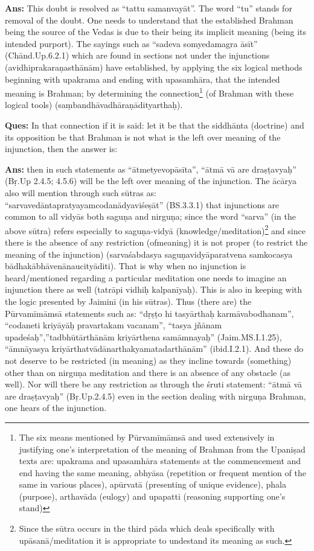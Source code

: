 \textbf{Ans:} This doubt is resolved as “tattu samanvayāt”. The word “tu” stands for removal of the doubt. One needs to understand that the established Brahman being the source of the Vedas is due to their being its implicit meaning (being its intended purport). The sayings such as “sadeva somyedamagra āsīt” (Chānd.Up.6.2.1) which are found in sections not under the injunctions (avidhiprakaraṇasthānām) have established, by applying the six logical methods beginning with upakrama and ending with upasamhāra, that the intended meaning is Brahman;  by determining the connection\footnote{The six means mentioned by Pūrvamīmāmsā and used extensively in justifying one’s interpretation of the meaning of Brahman from the Upaniṣad texts are: upakrama and upasamhāra statements at the commencement and end having the same meaning, abhyāsa (repetition or frequent mention of the same in various places), apūrvatā (presenting of unique evidence), phala (purpose), arthavāda (eulogy) and upapatti (reasoning supporting one’s stand)} (of Brahman with these logical tools) (saṃbandhāvadhāraṇādityarthaḥ).

\textbf{Ques:} In that connection if it is said: let it be that the siddhānta (doctrine) and its opposition be that Brahman is not what is the left over meaning of the injunction, then the answer is: 

\textbf{Ans:} then in such statements as “ātmetyevopāsīta”, “ātmā vā are dra\-ṣṭavyaḥ” (Bṛ.Up 2.4.5; 4.5.6) will be the left over meaning of the injunction. The ācārya also will mention through such sūtras as: “sarvavedāntapratyayamcodanādyaviśeṣāt” (BS.3.3.1) that injunctions are common to all vidyās both saguṇa and nirguṇa; since the word “sarva” (in the above sūtra) refers especially to saguṇa-vidyā (knowledge/\-meditation)\footnote{Since the sūtra occurs in the third pāda which deals specifically with upāsanā/\-meditation it is appropriate to undestand its meaning as such.} and since there is the absence of any restriction (of\break meaning) it is not proper (to restrict the meaning of the injunction) (sarvaśabdasya saguṇavidyāparatvena samkocasya bādhakābhāvenānaucityāditi). That is why when no injunction is heard/mentioned regarding a particular meditation one needs to imagine an injunction there as well (tatrāpi vidhiḥ kalpanīyaḥ). This is also in keeping with the logic presented by Jaiminī (in his sūtras). Thus (there are) the  Pūrvamīmāmsā statements such as: “dṛṣṭo hi tasyārthaḥ karmāvabodhanam”, “codaneti kriyāyāḥ pravartakam vacanam”, “tasya jñānam upadeśaḥ”,”tadbhūtārthānām kriyārthena samāmnayaḥ” (Jaim.MS.\break\-I.1.25), “āmnāyasya kriyārthatvādānarthakyamatadarthānām” (ibid.\break\-I.2.1). And these do not deserve to be restricted (in meaning) as they incline towards (something) other than on nirguṇa meditation and there is an absence of any obstacle (as well). Nor will there be any restriction as through the śruti statement: “ātmā vā are draṣṭavyaḥ” (Bṛ.Up.2.4.5) even in the section dealing with nirguṇa Brahman, one hears of the injunction.

